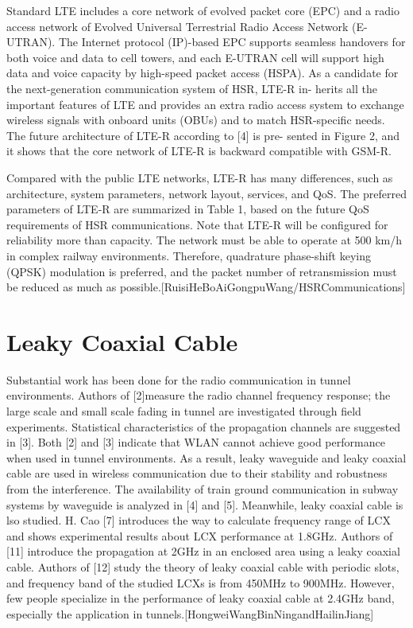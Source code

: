 Standard LTE includes a core network of evolved packet core (EPC) and a radio access network of Evolved
Universal Terrestrial Radio Access Network (E-UTRAN). The Internet protocol (IP)-based EPC supports seamless
handovers for both voice and data to cell towers, and each E-UTRAN cell will support high data and voice capacity by
high-speed packet access (HSPA). As a candidate for the next-generation communication system of HSR, LTE-R in-
herits all the important features of LTE and provides an extra radio access system to exchange wireless signals with
onboard units (OBUs) and to match HSR-specific needs. The future architecture of LTE-R according to [4] is pre-
sented in Figure 2, and it shows that the core network of LTE-R is backward compatible with GSM-R.

Compared with the public LTE networks, LTE-R has many differences, such as architecture, system parameters, network layout, services, and QoS. The preferred
parameters of LTE-R are summarized in Table 1, based on the future QoS requirements of HSR communications. Note that LTE-R will be configured for reliability
more than capacity. The network must be able to operate at 500 km/h in complex railway environments. Therefore, quadrature phase-shift keying (QPSK) modulation 
is ­preferred, and the packet number of retransmission must be reduced as much as possible.[RuisiHeBoAiGongpuWang/HSRCommunications]


\section{Leaky Coaxial Cable}
Substantial work has been done for the radio communication in tunnel environments. Authors of [2]measure the radio channel frequency response; the large scale and small scale
fading in tunnel are investigated through field experiments. Statistical characteristics of the propagation channels are
suggested in [3]. Both [2] and [3] indicate that WLAN cannot achieve good performance when used in tunnel environments.
As a result, leaky waveguide and leaky coaxial cable are used in wireless communication due to their stability and
robustness from the interference. The availability of train ground communication in subway systems by waveguide is
analyzed in [4] and [5]. Meanwhile, leaky coaxial cable is lso studied. H. Cao [7] introduces the way to calculate frequency range of LCX and shows experimental results about
LCX performance at 1.8GHz. Authors of [11] introduce the propagation at 2GHz in an enclosed area using a leaky coaxial
cable. Authors of [12] study the theory of leaky coaxial cable with periodic slots, and frequency band of the studied LCXs
is from 450MHz to 900MHz. However, few people specialize in the performance of leaky coaxial cable at 2.4GHz band, especially the application in tunnels.[HongweiWangBinNingandHailinJiang]

